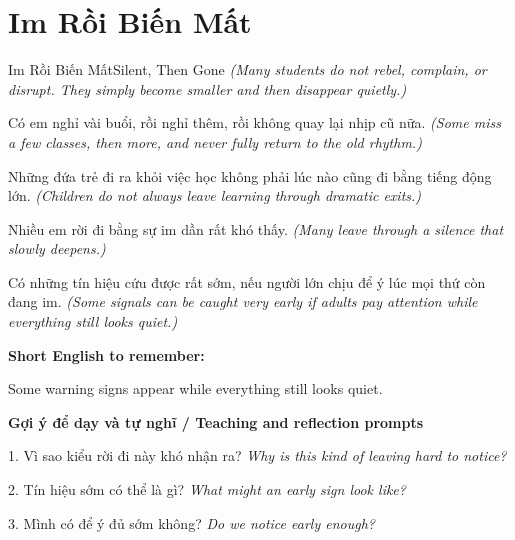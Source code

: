 \section{Im Rồi Biến Mất}
\begin{truyen}{Im Rồi Biến Mất}{Silent, Then Gone}
\textit{(Many students do not rebel, complain, or disrupt. They simply become smaller and then disappear quietly.)}

Có em nghỉ vài buổi, rồi nghỉ thêm, rồi không quay lại nhịp cũ nữa.
\textit{(Some miss a few classes, then more, and never fully return to the old rhythm.)}

Những đứa trẻ đi ra khỏi việc học không phải lúc nào cũng đi bằng tiếng động lớn.
\textit{(Children do not always leave learning through dramatic exits.)}

Nhiều em rời đi bằng sự im dần rất khó thấy.
\textit{(Many leave through a silence that slowly deepens.)}

\end{truyen}

\begin{baihoc}
Có những tín hiệu cứu được rất sớm, nếu người lớn chịu để ý lúc mọi thứ còn đang im.
\textit{(Some signals can be caught very early if adults pay attention while everything still looks quiet.)}
\end{baihoc}

\begin{ghinhoanh}
\textbf{Short English to remember:}

Some warning signs appear while everything still looks quiet.

\end{ghinhoanh}

\begin{tuhocnhanh}
\textbf{Gợi ý để dạy và tự nghĩ / Teaching and reflection prompts}

1. Vì sao kiểu rời đi này khó nhận ra? \textit{Why is this kind of leaving hard to notice?}

2. Tín hiệu sớm có thể là gì? \textit{What might an early sign look like?}

3. Mình có để ý đủ sớm không? \textit{Do we notice early enough?}
\end{tuhocnhanh}
\ngancach

